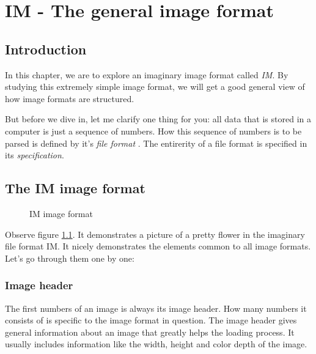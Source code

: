\chapter{IM - The general image format}
\label{cha:im}

\begin{refsection}

  \section{Introduction}
  \label{sec:introduction}

  In this chapter, we are to explore an imaginary image format called
  \textit{IM}. By studying this extremely simple image format, we will get a good
  general view of how image formats are structured.

  But before we dive in, let me clarify one thing for you: all data that
  is stored in a computer is just a sequence of numbers. How this
  sequence of numbers is to be parsed is defined by it's \textit{file
    format} . The entirerity of a file format is
  specified in its \textit{specification}.

  \section{The IM image format}
  \label{sec:general-image-format}

  \begin{figure}[h!]
    \centering
    \caption{IM image format}
    \label{fig:im}
  \end{figure}

  Observe figure \ref{fig:im}. It demonstrates a picture of a pretty
  flower in the imaginary file format IM. It nicely
  demonstrates the elements common to all image formats. Let's go
  through them one by one:

  \subsection{Image header}
  \label{sec:image-header}

  The first numbers of an image is always its image header. How many numbers it consists of is specific to the image
  format in question. The image header gives general information about
  an image that greatly helps the loading process. It usually includes
  information like the width, height and color depth of the image.


\end{refsection}
